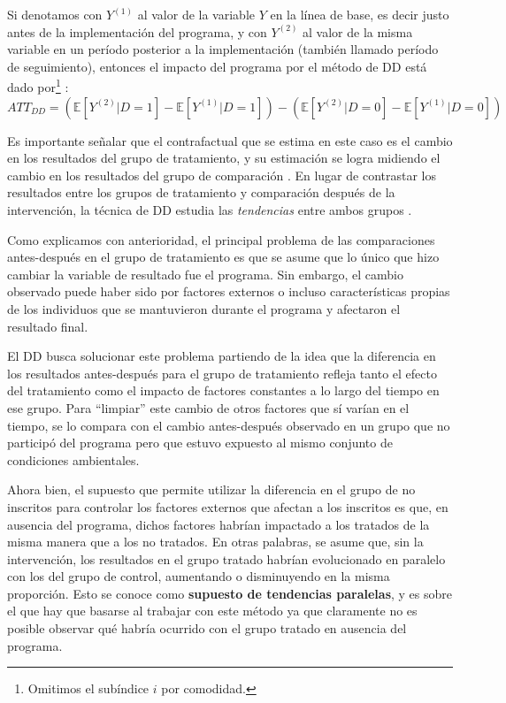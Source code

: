\documentclass[../../main.tex]{subfiles}
\begin{document}
Si denotamos con \(Y^{(1)}\) al valor de la variable \(Y\) en la línea de base, es decir
justo antes de la implementación del programa, y con \(Y^{(2)}\) al valor de la misma
variable en un período posterior a la implementación (también llamado período de
seguimiento), entonces el impacto del programa por el método de DD está dado
por\footnote{Omitimos el subíndice \(i\) por comodidad.} :
\begin{equation}
    ATT_{DD} =
        \left(
            \mathbb{E}\left[Y^{(2)}|D=1\right] - \mathbb{E}\left[Y^{(1)}|D=1\right]
        \right) -
        \left(
            \mathbb{E}\left[Y^{(2)}|D=0\right] - \mathbb{E}\left[Y^{(1)}|D=0\right]
        \right)
        \label{eq:dif-en-dif-1}
\end{equation}

Es importante señalar que el contrafactual que se estima en este caso es el cambio en los
resultados del grupo de tratamiento, y su estimación se logra midiendo el cambio en los
resultados del grupo de comparación \cite{gertler-2016}. En lugar de contrastar los
resultados entre los grupos de tratamiento y comparación después de la intervención, la
técnica de DD estudia las \textit{tendencias} entre ambos grupos \cite{gertler-2016}.

Como explicamos con anterioridad, el principal problema de las comparaciones antes-después
en el grupo de tratamiento es que se asume que lo único que hizo cambiar la variable de
resultado fue el programa. Sin embargo, el cambio observado puede haber sido por factores
externos o incluso características propias de los individuos que se mantuvieron durante el
programa y afectaron el resultado final.

El DD busca solucionar este problema partiendo de la idea que la diferencia en los
resultados antes-después para el grupo de tratamiento refleja tanto el efecto del
tratamiento como el impacto de factores constantes a lo largo del tiempo en ese
grupo. Para ``limpiar'' este cambio de otros factores que sí varían en el tiempo, se lo
compara con el cambio antes-después observado en un grupo que no participó del programa
pero que estuvo expuesto al mismo conjunto de condiciones ambientales.

Ahora bien, el supuesto que permite utilizar la diferencia en el grupo de no inscritos
para controlar los factores externos que afectan a los inscritos es que, en ausencia del
programa, dichos factores habrían impactado a los tratados de la misma manera que a los no
tratados. En otras palabras, se asume que, sin la intervención, los resultados en el grupo
tratado habrían evolucionado en paralelo con los del grupo de control, aumentando o
disminuyendo en la misma proporción. Esto se conoce como \textbf{supuesto de tendencias
paralelas}, y es sobre el que hay que basarse al trabajar con este método ya que
claramente no es posible observar qué habría ocurrido con el grupo tratado en ausencia del
programa.
\end{document}
